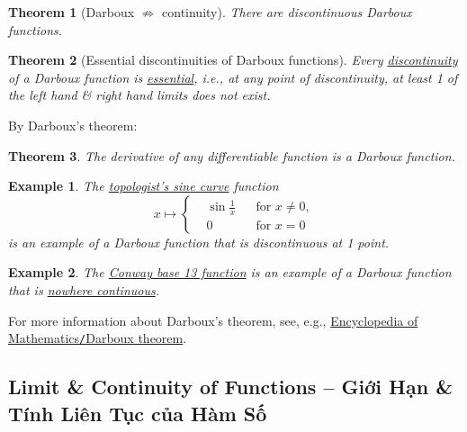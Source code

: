 \documentclass{article}
\newtheorem{example}{Example}
\newtheorem{theorem}{Theorem}
\begin{document}
\begin{theorem}[Darboux $\not\Rightarrow$ continuity]
	There are discontinuous Darboux functions.
\end{theorem}

\begin{theorem}[Essential discontinuities of Darboux functions]
	Every \href{https://en.wikipedia.org/wiki/Discontinuity_(mathematics)}{discontinuity} of a Darboux function is \href{https://en.wikipedia.org/wiki/Essential_discontinuity}{essential}, i.e., at any point of discontinuity, at least 1 of the left hand \& right hand limits does not exist.
\end{theorem}
By {\sc Darboux}'s theorem:

\begin{theorem}
	The derivative of any differentiable function is a Darboux function.
\end{theorem}

\begin{example}
	The \href{https://en.wikipedia.org/wiki/Topologist%27s_sine_curve}{topologist's sine curve} function
	\begin{equation*}
		x\mapsto\left\{\begin{split}
			&\sin\frac{1}{x}&&\mbox{for } x\ne0,\\
			&0&&\mbox{for } x = 0
		\end{split}\right.
	\end{equation*}
	is an example of a Darboux function that is discontinuous at 1 point.
\end{example}

\begin{example}
	The \href{https://en.wikipedia.org/wiki/Conway_base_13_function}{Conway base 13 function} is an example of a Darboux function that is \href{https://en.wikipedia.org/wiki/Nowhere_continuous_function}{nowhere continuous}.
\end{example}






For more information about {\sc Darboux}'s theorem, see, e.g., \href{https://encyclopediaofmath.org/index.php?title=Darboux_theorem}{Encyclopedia of Mathematics{\tt/}Darboux theorem}.


\subsection{Limit \& Continuity of Functions -- Giới Hạn \& Tính Liên Tục của Hàm Số}
\end{document}

